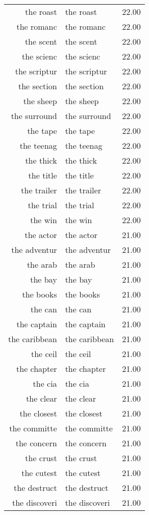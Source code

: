 \begin{table}[ht]
\begin{tabular}{rlr}
  the roast & the roast & 22.00 \\ 
  the romanc & the romanc & 22.00 \\ 
  the scent & the scent & 22.00 \\ 
  the scienc & the scienc & 22.00 \\ 
  the scriptur & the scriptur & 22.00 \\ 
  the section & the section & 22.00 \\ 
  the sheep & the sheep & 22.00 \\ 
  the surround & the surround & 22.00 \\ 
  the tape & the tape & 22.00 \\ 
  the teenag & the teenag & 22.00 \\ 
  the thick & the thick & 22.00 \\ 
  the title & the title & 22.00 \\ 
  the trailer & the trailer & 22.00 \\ 
  the trial & the trial & 22.00 \\ 
  the win & the win & 22.00 \\ 
  the actor & the actor & 21.00 \\ 
  the adventur & the adventur & 21.00 \\ 
  the arab & the arab & 21.00 \\ 
  the bay & the bay & 21.00 \\ 
  the books & the books & 21.00 \\ 
  the can & the can & 21.00 \\ 
  the captain & the captain & 21.00 \\ 
  the caribbean & the caribbean & 21.00 \\ 
  the ceil & the ceil & 21.00 \\ 
  the chapter & the chapter & 21.00 \\ 
  the cia & the cia & 21.00 \\ 
  the clear & the clear & 21.00 \\ 
  the closest & the closest & 21.00 \\ 
  the committe & the committe & 21.00 \\ 
  the concern & the concern & 21.00 \\ 
  the crust & the crust & 21.00 \\ 
  the cutest & the cutest & 21.00 \\ 
  the destruct & the destruct & 21.00 \\ 
  the discoveri & the discoveri & 21.00 \\ 

\end{tabular}
\end{table}
